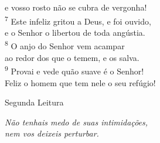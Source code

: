 \documentclass{book}
\begin{document}
\begin{flushleft}
    e vosso rosto não se cubra de vergonha!\\
    \textsuperscript{\underline{\hspace{.07in}}\textcolor{VioletRed1}{7}} Este infeliz gritou a Deus, e foi ouvido, \textsuperscript{\gresixstar{}}\\
    e o Senhor o libertou de toda angústia.
    \hspace{\fill}\RbarRed{}
    \vspace{.1cm}\\
    \textsuperscript{\underline{\hspace{.07in}}\textcolor{VioletRed1}{8}} O anjo do Senhor vem acampar \textsuperscript{\gresixstar{}}\\
    ao redor dos que o temem, e os salva.\\
    \textsuperscript{\underline{\hspace{.07in}}\textcolor{VioletRed1}{9}} Provai e vede quão suave é o Senhor! \textsuperscript{\gresixstar{}}\\
    Feliz o homem que tem nele o seu refúgio!
    \hspace{\fill}\RbarRed{}
    \newpage
\end{flushleft}
\begin{center}
    \textcolor{VioletRed1}{Segunda Leitura}
\end{center}
\begin{flushright}
    \textit{Não tenhais medo de suas intimidações,\\ nem vos deixeis perturbar.}
\end{flushright}
\end{document}
